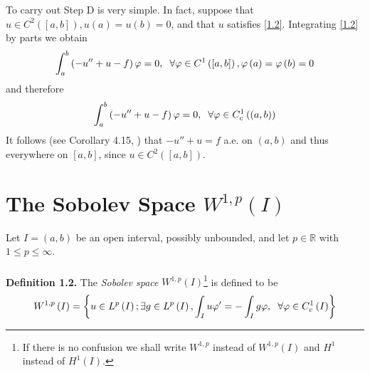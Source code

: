 \documentclass[a4paper,oneside]{book}
\numberwithin{equation}{chapter}
\begin{document}
To carry out Step D is very simple. In fact, suppose that $u \in {C^2}\left( {\left[ {a,b} \right]} \right),u\left( a \right) = u\left( b \right) = 0$, and that $u$ satisfies \eqref{1.2}. Integrating \eqref{1.2} by parts we obtain
\begin{align}
\int_a^b {\left( { - u'' + u - f} \right)\varphi }  = 0,\hspace{0.2cm}\forall \varphi  \in {C^1}\left( {\left[ {a,b} \right]} \right),\varphi \left( a \right) = \varphi \left( b \right) = 0
\end{align}
and therefore
\begin{align}
\int_a^b {\left( { - u'' + u - f} \right)\varphi }  = 0,\hspace{0.2cm}\forall \varphi  \in C_c^1\left( {\left( {a,b} \right)} \right)
\end{align}
It follows (see Corollary 4.15, \cite{1}) that $-u''+u=f$  a.e. on $\left(a,b\right)$ and thus everywhere on $\left[a,b\right]$, since $u \in {C^2}\left( {\left[ {a,b} \right]} \right)$.
\section{The Sobolev Space $W^{1,p}\left(I\right)$}
Let $I=\left(a,b\right)$ be an open interval, possibly unbounded, and let $p \in \mathbb{R}$ with $1\le p \le \infty$.\\
\\
\textbf{Definition 1.2.} The \textit{Sobolev space} $W^{1,p}\left(I\right)$\footnote{If there is no confusion we shall write $W^{1,p}$ instead of $W^{1,p}\left(I\right)$ and $H^1$ instead of $H^1\left(I\right)$.} is defined to be
\begin{align}
\label{1.5}
{W^{1,p}}\left( I \right) = \left\{ {u \in {L^p}\left( I \right);\exists g \in {L^p}\left( I \right),\int_I {u\varphi '}  =  - \int_I {g\varphi } ,\hspace{0.2cm}\forall \varphi  \in C_c^1\left( I \right)} \right\}
\end{align}
\end{document}
